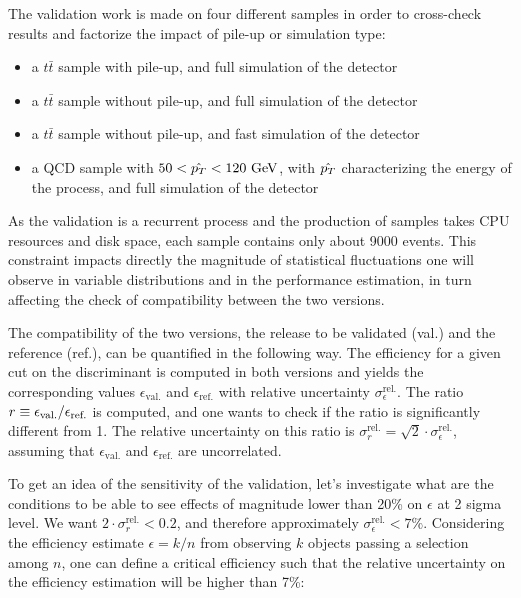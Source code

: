     The validation work is made on four different samples in order to
    cross-check results and factorize the impact of pile-up or simulation type:
    \begin{itemize}
        \item a $t\bar{t}$ sample with pile-up, and full simulation of the
            detector
        \item a $t\bar{t}$ sample without pile-up, and full simulation of the
            detector
        \item a $t\bar{t}$ sample without pile-up, and fast simulation of the
            detector
        \item a QCD sample with $50 < \hat{p_T} < 120~\text{GeV}$, with $\hat{p_T}$
            characterizing the energy of the process, and full simulation of the
            detector
    \end{itemize}

    As the validation is a recurrent process and the production of samples takes
    CPU resources and disk space, each sample contains only about 9000 events.
    This constraint impacts directly the magnitude of statistical fluctuations
    one will observe in variable distributions and in the performance
    estimation, in turn affecting the check of compatibility between the two
    versions.

    The compatibility of the two versions, the release to be validated (val.)
    and the reference (ref.), can be quantified in the following way. The
    efficiency for a given cut on the discriminant is computed in both versions
    and yields the corresponding values $\epsilon_\text{val.}$ and
    $\epsilon_\text{ref.}$ with relative uncertainty
    $\sigma^\text{rel.}_\epsilon$. The ratio $r \equiv
    \epsilon_\text{val.}/\epsilon_\text{ref.}$ is computed, and one wants to
    check if the ratio is significantly different from 1.  The relative
    uncertainty on this ratio is $\sigma^\text{rel.}_r = \sqrt{2} \cdot
    \sigma^\text{rel.}_\epsilon$, assuming that $\epsilon_\text{val.}$ and
    $\epsilon_\text{ref.}$ are uncorrelated.

    To get an idea of the sensitivity of the validation, let's investigate what
    are the conditions to be able to see effects of magnitude lower than 20\% on
    $\epsilon$ at 2 sigma level. We want $2 \cdot \sigma^\text{rel.}_r < 0.2$,
    and therefore approximately $\sigma^\text{rel.}_\epsilon < 7\%$. Considering
    the efficiency estimate $\epsilon = k/n$ from observing $k$ objects passing
    a selection among $n$, one can define a critical efficiency such that the
    relative uncertainty on the efficiency estimation will be higher than 7\%:

